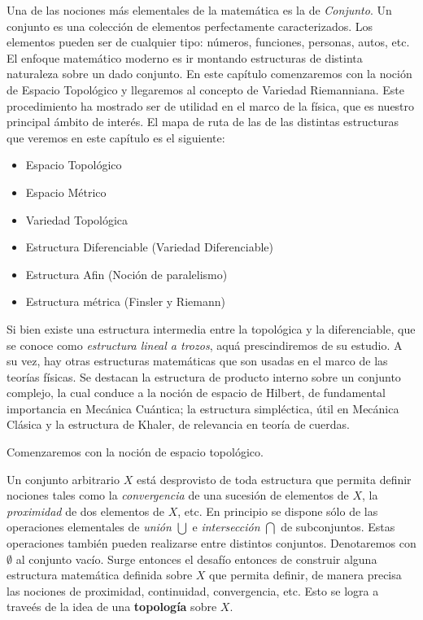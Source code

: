 \label{s:3.1}

Una  de  las  nociones m\'as  elementales  de  la  matem\'atica  es la  de  {\it
  Conjunto}.  Un   conjunto  es  una  colecci\'on   de  elementos  perfectamente
caracterizados.  Los   elementos  pueden  ser  de   cualquier  tipo:  n\'umeros,
funciones, personas, autos, etc. El  enfoque matem\'atico moderno es ir montando
estructuras de  distinta naturaleza sobre  un dado conjunto. En  este cap\'itulo
comenzaremos con la noci\'on de Espacio Topol\'ogico y llegaremos al concepto de
Variedad Riemanniana. Este procedimiento ha mostrado ser de utilidad en el marco
de la f\'isica, que es nuestro principal \'ambito de inter\'es.  El mapa de ruta
de  las de  las  distintas estructuras  que  veremos en  este  cap\'itulo es  el
siguiente:
%
\begin{itemize}
\item Espacio Topol\'ogico
\item Espacio M\'etrico
\item Variedad Topol\'ogica
\item Estructura Diferenciable (Variedad Diferenciable)
\item Estructura Afin (Noci\'on de paralelismo)
\item Estructura m\'etrica (Finsler y Riemann)
\end{itemize}

Si  bien   existe  una  estructura   intermedia  entre  la  topol\'ogica   y  la
diferenciable,  que se  conoce como  {\it  estructura lineal  a trozos},  aqu\'a
prescindiremos de su estudio. A  su vez, hay otras estructuras matem\'aticas que
son usadas en el marco de  las teor\'ias f\'isicas. Se destacan la estructura de
producto interno  sobre un conjunto complejo,  la cual conduce a  la noci\'on de
espacio  de Hilbert,  de fundamental  importancia en  Mec\'anica  Cu\'antica; la
estructura  simpl\'ectica, \'util  en Mec\'anica  Cl\'asica y  la  estructura de
Khaler, de relevancia en teor\'ia de cuerdas.

Comenzaremos con la noci\'on de espacio topol\'ogico.




Un conjunto  arbitrario $X$  est\'a desprovisto de  toda estructura  que permita
definir nociones tales como la {\it convergencia} de una sucesi\'on de elementos
de  $X$, la  {\it proximidad}  de dos  elementos de  $X$, etc.  En  principio se
dispone s\'olo de las operaciones  elementales de {\it uni\'on} $\bigcup$ e {\it
  intersecci\'on} $\bigcap$ de  subconjuntos. Estas operaciones tambi\'en pueden
realizarse entre  distintos conjuntos.  Denotaremos con $\emptyset$  al conjunto
vac\'io.  Surge entonces el  desaf\'io entonces  de construir  alguna estructura
matem\'atica  definida sobre  $X$ que  permita  definir, de  manera precisa  las
nociones  de  proximidad,  continuidad,  convergencia,  etc.  Esto  se  logra  a
trave\'es de la idea de una {\bf topolog\'ia} sobre $X$.


